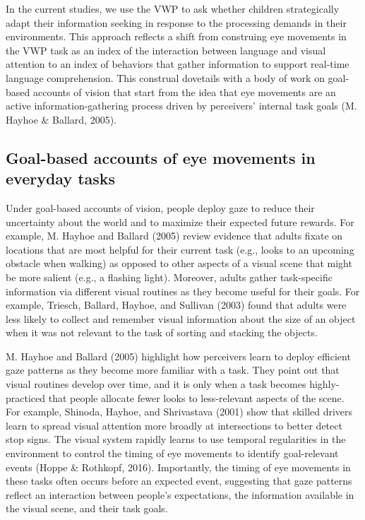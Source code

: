 \documentclass[,man,floatsintext]{apa6}
\begin{document}
In the current studies, we use the VWP to ask whether children
strategically adapt their information seeking in response to the
processing demands in their environments. This approach reflects a shift
from construing eye movements in the VWP task as an index of the
interaction between language and visual attention to an index of
behaviors that gather information to support real-time language
comprehension. This construal dovetails with a body of work on
goal-based accounts of vision that start from the idea that eye
movements are an active information-gathering process driven by
perceivers' internal task goals (M. Hayhoe \& Ballard, 2005).

\subsection{Goal-based accounts of eye movements in everyday
tasks}\label{goal-based-accounts-of-eye-movements-in-everyday-tasks}

Under goal-based accounts of vision, people deploy gaze to reduce their
uncertainty about the world and to maximize their expected future
rewards. For example, M. Hayhoe and Ballard (2005) review evidence that
adults fixate on locations that are most helpful for their current task
(e.g., looks to an upcoming obstacle when walking) as opposed to other
aspects of a visual scene that might be more salient (e.g., a flashing
light). Moreover, adults gather task-specific information via different
visual routines as they become useful for their goals. For example,
Triesch, Ballard, Hayhoe, and Sullivan (2003) found that adults were
less likely to collect and remember visual information about the size of
an object when it was not relevant to the task of sorting and stacking
the objects.

M. Hayhoe and Ballard (2005) highlight how perceivers learn to deploy
efficient gaze patterns as they become more familiar with a task. They
point out that visual routines develop over time, and it is only when a
task becomes highly-practiced that people allocate fewer looks to
less-relevant aspects of the scene. For example, Shinoda, Hayhoe, and
Shrivastava (2001) show that skilled drivers learn to spread visual
attention more broadly at intersections to better detect stop signs. The
visual system rapidly learns to use temporal regularities in the
environment to control the timing of eye movements to identify
goal-relevant events (Hoppe \& Rothkopf, 2016). Importantly, the timing
of eye movements in these tasks often occurs before an expected event,
suggesting that gaze patterns reflect an interaction between people's
expectations, the information available in the visual scene, and their
task goals.
\end{document}

